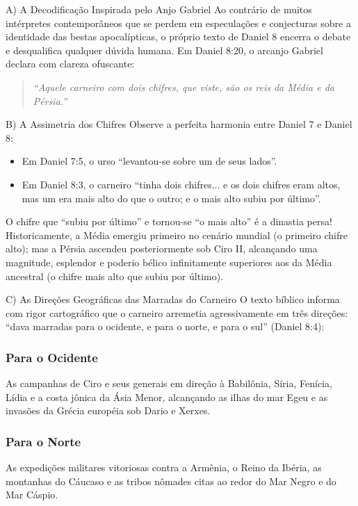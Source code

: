 A) A Decodificação Inspirada pelo Anjo Gabriel
Ao contrário de muitos intérpretes contemporâneos que se perdem em especulações e conjecturas sobre a identidade das bestas apocalípticas, o próprio texto de Daniel 8 encerra o debate e desqualifica qualquer dúvida humana. Em Daniel 8:20, o arcanjo Gabriel declara com clareza ofuscante:

\begin{quote}
\itshape ``Aquele carneiro com dois chifres, que viste, são os reis da Média e da Pérsia.''
\end{quote}


B) A Assimetria dos Chifres
Observe a perfeita harmonia entre Daniel 7 e Daniel 8:
\begin{itemize}
  \item Em Daniel 7:5, o urso ``levantou-se sobre um de seus lados''.
  \item Em Daniel 8:3, o carneiro ``tinha dois chifres... e os dois chifres eram altos, mas um era mais alto do que o outro; e o mais alto subiu por último''.
\end{itemize}

O chifre que ``subiu por último'' e tornou-se ``o mais alto'' é a dinastia persa! Historicamente, a Média emergiu primeiro no cenário mundial (o primeiro chifre alto); mas a Pérsia ascendeu posteriormente sob Ciro II, alcançando uma magnitude, esplendor e poderio bélico infinitamente superiores aos da Média ancestral (o chifre mais alto que subiu por último).

C) As Direções Geográficas das Marradas do Carneiro
O texto bíblico informa com rigor cartográfico que o carneiro arremetia agressivamente em três direções: ``dava marradas para o ocidente, e para o norte, e para o sul'' (Daniel 8:4):

\subsubsection*{Para o Ocidente}
As campanhas de Ciro e seus generais em direção à Babilônia, Síria, Fenícia, Lídia e a costa jônica da Ásia Menor, alcançando as ilhas do mar Egeu e as invasões da Grécia européia sob Dario e Xerxes.

\subsubsection*{Para o Norte}
As expedições militares vitoriosas contra a Armênia, o Reino da Ibéria, as montanhas do Cáucaso e as tribos nômades citas ao redor do Mar Negro e do Mar Cáspio.

